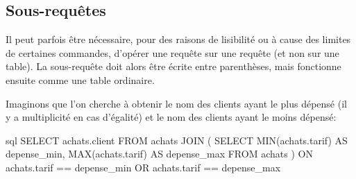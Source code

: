 \documentclass[a4paper]{scrartcl}
\begin{document}
		\subsection{Sous-requêtes}
			Il peut parfois être nécessaire, pour des raisons de lisibilité ou à cause des limites de certaines commandes, 
			d'opérer une requête sur une requête (et non sur une table). La sous-requête doit alors être écrite entre parenthèses,
			mais fonctionne ensuite comme une table ordinaire.
			
			\exemple Imaginons que l'on cherche à obtenir le nom des clients ayant le plus dépensé (il y a multiplicité en cas d'égalité)
			et le nom des clients ayant le moins dépensé:

			\begin{code}{sql}
				SELECT achats.client
				FROM achats
				JOIN
				(
					SELECT MIN(achats.tarif) AS depense_min, MAX(achats.tarif) AS depense_max
					FROM achats
				)
				ON achats.tarif == depense_min OR achats.tarif == depense_max
			\end{code}
		
\end{document}
